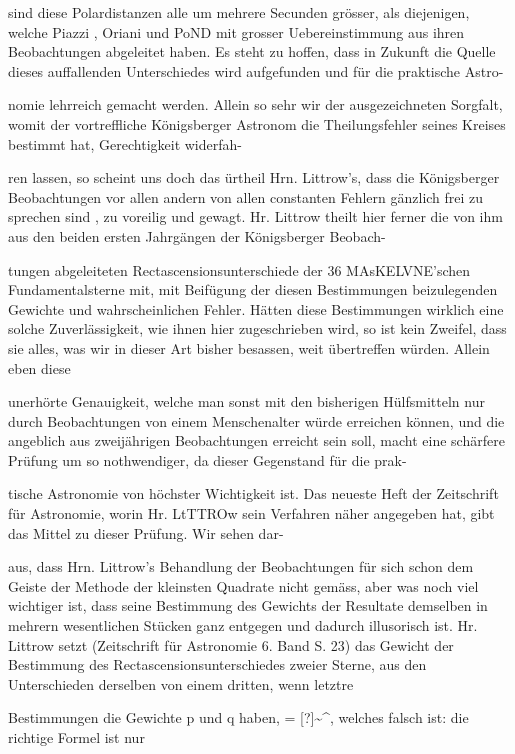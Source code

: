\documentclass[10pt,a4paper]{article}
\begin{document}
sind diese Polardistanzen alle um mehrere Secunden grösser, als diejenigen, welche Piazzi , Oriani und PoND mit grosser Uebereinstimmung aus ihren Beobachtungen abgeleitet haben. Es steht zu hoffen, dass in Zukunft die Quelle dieses auffallenden Unterschiedes wird aufgefunden und für die praktische Astro-

nomie lehrreich gemacht werden. Allein so sehr wir der ausgezeichneten Sorgfalt, womit der vortreffliche Königsberger Astronom die Theilungsfehler seines Kreises bestimmt hat, Gerechtigkeit widerfah-

ren lassen, so scheint uns doch das ürtheil Hrn. Littrow's, dass die Königsberger Beobachtungen vor allen andern von allen constanten Fehlern gänzlich frei zu sprechen sind , zu voreilig und gewagt. Hr. Littrow theilt hier ferner die von ihm aus den beiden ersten Jahrgängen der Königsberger Beobach-

tungen abgeleiteten Rectascensionsunterschiede der 36 MAsKELVNE'schen Fundamentalsterne mit, mit Beifügung der diesen Bestimmungen beizulegenden Gewichte und wahrscheinlichen Fehler. Hätten diese Bestimmungen wirklich eine solche Zuverlässigkeit, wie ihnen hier zugeschrieben wird, so ist kein Zweifel, dass sie alles, was wir in dieser Art bisher besassen, weit übertreffen würden. Allein eben diese

unerhörte Genauigkeit, welche man sonst mit den bisherigen Hülfsmitteln nur durch Beobachtungen von einem Menschenalter würde erreichen können, und die angeblich aus zweijährigen Beobachtungen erreicht sein soll, macht eine schärfere Prüfung um so nothwendiger, da dieser Gegenstand für die prak-

tische Astronomie von höchster Wichtigkeit ist. Das neueste Heft der Zeitschrift für Astronomie, worin Hr. LtTTROw sein Verfahren näher angegeben hat, gibt das Mittel zu dieser Prüfung. Wir sehen dar-

aus, dass Hrn. Littrow's Behandlung der Beobachtungen für sich schon dem Geiste der Methode der kleinsten Quadrate nicht gemäss, aber was noch viel wichtiger ist, dass seine Bestimmung des Gewichts der Resultate demselben in mehrern wesentlichen Stücken ganz entgegen und dadurch illusorisch ist. Hr. Littrow setzt (Zeitschrift für Astronomie 6. Band S. 23) das Gewicht der Bestimmung des Rectascensionsunterschiedes zweier Sterne, aus den Unterschieden derselben von einem dritten, wenn letztre

Bestimmungen die Gewichte p und q haben, = [?]\textasciitilde{}\textasciicircum{}, welches falsch ist: die richtige Formel ist nur
\end{document}

